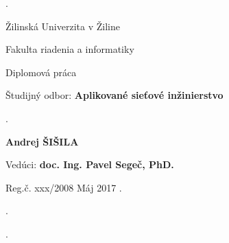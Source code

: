 \begin{titlepage}

\phantom.

\bigskip

\begin{center}
{\sc\LARGE Žilinská Univerzita v Žiline}
\medskip

{\sc\Large Fakulta riadenia a informatiky}

\vfill\vfill\vfill\vfill

{\sc\LARGE Diplomová práca}

\medskip

{\large Študijný odbor: {\bf Aplikované sieťové inžinierstvo}}
\end{center}


\vfill\vfill\vfill\vfill


\phantom.\hfill
\begin{minipage}{10cm}
\begin{center}
{\large\bf Andrej ŠIŠILA}

\medskip

{\large\bf \nazovpraceSK}

\medskip

Vedúci: {\bf doc. Ing. Pavel Segeč, PhD.}

\medskip
 
\hfill
Reg.č. xxx/2008 
\hfill
Máj 2017
\hfill\phantom.
\end{center}
\end{minipage}
\hspace{1.7cm}\phantom.

\vspace{2.9cm}

\phantom.
\end{titlepage}



\begin{abstract}

\noindent
{\sc Šišila Andrej:} {\em \nazovpraceSK}
[Diplomová práca] 

\noindent
Žilinská Univerzita v~Žiline,  
Fakulta riadenia a informatiky,  
Katedra informačných sietí.

\noindent  
Vedúci: doc. Ing. Pavel Segeč, PhD.
 
\noindent  
Stupeň odbornej kvalifikácie:
Inžinier v odbore Aplikované sieťové inžinierstvo, Žilina. 

\noindent
FRI ŽU v Žiline, 2017 TODO s.

\bigskip

Obsahom práce je ... TODO


\end{abstract}


